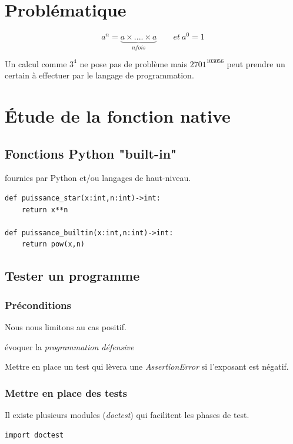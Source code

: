 \documentclass[a4paper,11pt]{article}
\begin{document}
\begin{Form}
\section{Problématique}
$$a^n=\underbrace{a ×....× a}_{n fois}\qquad et\ a^0=1$$

Un calcul comme $3^4$ ne pose pas de problème mais $2701^{103056}$ peut prendre un certain à effectuer par le langage de programmation.
\begin{center}
\end{center}
\section{Étude de la fonction native}
\subsection{Fonctions  Python "built-in"}
\begin{commentprof}
fournies par Python et/ou langages de haut-niveau.
\end{commentprof}
\begin{lstlisting}
def puissance_star(x:int,n:int)->int:
    return x**n

def puissance_builtin(x:int,n:int)->int:
    return pow(x,n)
\end{lstlisting}
\subsection{Tester un programme}
\subsubsection{Préconditions}
Nous nous limitons au cas positif.
\begin{commentprof}
évoquer la \emph{programmation défensive}
\end{commentprof}
\begin{activite}
Mettre en place un test qui lèvera une \emph{AssertionError} si l'exposant est négatif.
\end{activite}
\subsubsection{Mettre en place des tests}
Il existe plusieurs modules (\emph{doctest}) qui facilitent les phases de test. 
\begin{lstlisting}
import doctest


\end{lstlisting}
\end{Form}
\end{document}
